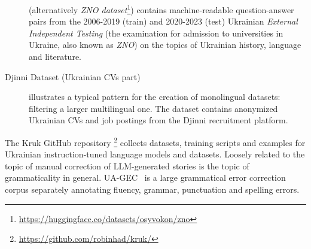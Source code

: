 \begin{description}
    (alternatively \textit{ZNO dataset}\footnote{\href{https://huggingface.co/datasets/osyvokon/zno}{https://huggingface.co/datasets/osyvokon/zno}})
    contains machine-readable question-answer pairs from the 2006-2019 (train) and 2020-2023 (test) Ukrainian \textit{External Independent Testing} (the examination for admission to universities in Ukraine, also known as \textit{ZNO}) on the topics of Ukrainian history, language and literature. 
    \item[Djinni Dataset (Ukrainian CVs part)~\cite{djinni}] illustrates a typical pattern for the creation of monolingual datasets: filtering a larger multilingual one. The dataset contains anonymized Ukrainian CVs and job postings from the Djinni recruitment platform.
\end{description}

The Kruk GitHub repository%
\footnote{\href{https://github.com/robinhad/kruk/}{https://github.com/robinhad/kruk/}} collects datasets, training scripts and examples for Ukrainian instruction-tuned language models and datasets.
Loosely related to the topic of manual correction of LLM-generated stories is the topic of grammaticality in general. UA-GEC~\citep{Syvokon2022} is a large grammatical error correction corpus separately annotating  fluency, grammar, punctuation and spelling errors. 




